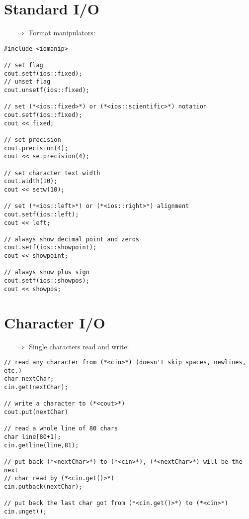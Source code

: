 \documentclass[10pt]{article}
\begin{document}
\section{Standard I/O}
\small
\begin{enumerate}
\item[$\Rightarrow$]  Format manipulators:
\end{enumerate}
\begin{lstlisting}
#include <iomanip>

// set flag
cout.setf(ios::fixed);
// unset flag
cout.unsetf(ios::fixed);

// set (*<ios::fixed>*) or (*<ios::scientific>*) notation
cout.setf(ios::fixed);
cout << fixed;

// set precision
cout.precision(4);
cout << setprecision(4);

// set character text width
cout.width(10);
cout << setw(10);

// set (*<ios::left>*) or (*<ios::right>*) alignment
cout.setf(ios::left);
cout << left;

// always show decimal point and zeros
cout.setf(ios::showpoint);
cout << showpoint;

// always show plus sign
cout.setf(ios::showpos);
cout << showpos;
\end{lstlisting}
%
%
\section{Character I/O}
\small
\begin{enumerate}
\item[$\Rightarrow$] Single characters read and write:
\end{enumerate}
\begin{lstlisting}
// read any character from (*<cin>*) (doesn't skip spaces, newlines, etc.)
char nextChar;
cin.get(nextChar);

// write a character to (*<cout>*)
cout.put(nextChar)

// read a whole line of 80 chars
char line[80+1];
cin.getline(line,81);

// put back (*<nextChar>*) to (*<cin>*), (*<nextChar>*) will be the next 
// char read by (*<cin.get()>*)
cin.putback(nextChar);

// put back the last char got from (*<cin.get()>*) to (*<cin>*)
cin.unget();
\end{lstlisting}
%
%
\end{document}
